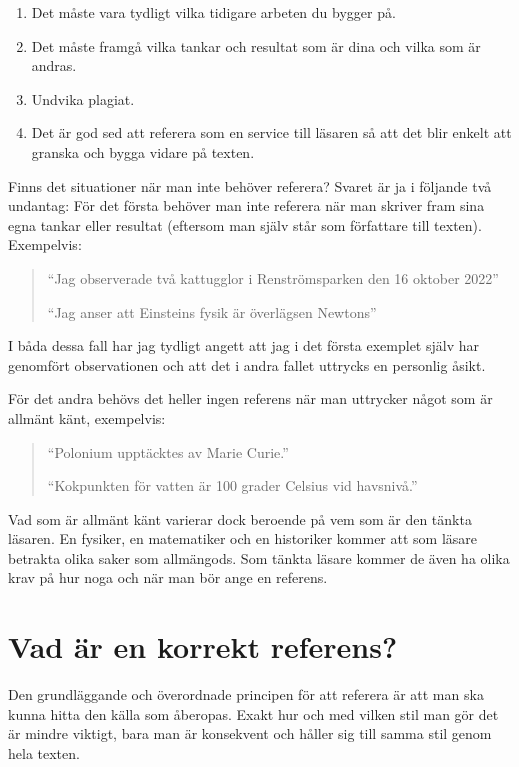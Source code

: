\documentclass[11pt,a4paper,footinclude=true,headinclude=true]{report} %
\begin{document}
\begin{small}
\begin{enumerate}
\item Det måste vara tydligt vilka tidigare arbeten du bygger på.
\item Det måste framgå vilka tankar och resultat som är dina och vilka som  är andras. 
\item Undvika plagiat.
\item Det är god sed att referera som en service till läsaren så att det blir enkelt att granska och bygga vidare på texten. 
\end{enumerate}
\end{small}

\noindent Finns det situationer när man inte behöver referera? Svaret är ja i följande två undantag: För det första behöver man inte referera när man skriver fram sina egna tankar eller resultat (eftersom man själv står som författare till texten). Exempelvis:

\begin{quote}
``Jag observerade två kattugglor i Renströmsparken den 16 oktober 2022''

``Jag anser att Einsteins fysik är överlägsen Newtons''
\end{quote}

\noindent I båda dessa fall har jag tydligt angett att jag i det första exemplet själv har genomfört observationen och att det i andra fallet uttrycks en personlig åsikt. 

För det andra behövs det heller ingen referens när man uttrycker något som är allmänt känt, exempelvis:

\begin{quote}
``Polonium upptäcktes av Marie Curie.''

``Kokpunkten för vatten är 100 grader Celsius vid havsnivå.''
\end{quote}

\noindent Vad som är allmänt känt varierar dock beroende på vem som är den tänkta läsaren. En fysiker, en matematiker och en historiker kommer att som läsare betrakta olika saker som allmängods. Som tänkta läsare kommer de även ha olika krav på hur noga och när man bör ange en referens. 

\section{Vad är en korrekt referens?}

Den grundläggande och överordnade principen för att referera är att man ska kunna hitta den källa som åberopas. Exakt hur och med vilken stil man gör det är mindre viktigt, bara man är konsekvent och håller sig till samma stil genom hela texten. 
\end{document}
